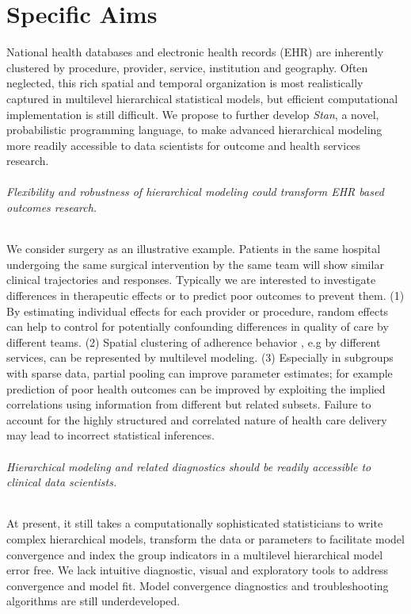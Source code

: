 \documentclass[11pt,notitlepage]{article}
\begin{document}
\part*{Specific Aims}
National health databases and electronic health records (EHR) are inherently clustered by procedure, provider, service, institution and geography. Often neglected, this rich spatial and temporal organization is most realistically captured in multilevel hierarchical statistical models, but efficient computational implementation is still difficult. We propose to further develop \textit{Stan}, a novel, probabilistic programming language, to make advanced hierarchical modeling more readily accessible to data scientists for outcome and health services research. 

\paragraph*{Flexibility and robustness of hierarchical modeling could transform EHR based outcomes research.} We consider surgery as an illustrative example. Patients in the same hospital undergoing the same surgical intervention by the same team will show similar clinical trajectories and responses. Typically we are interested to investigate differences in therapeutic effects or to predict poor outcomes to prevent them. (1) By estimating individual effects for each provider or procedure, random effects can help to control for potentially confounding differences in quality of care by different teams. (2) Spatial clustering of adherence behavior , e.g by different services, can be represented by multilevel modeling. (3) Especially in subgroups with sparse data, partial pooling can improve parameter estimates; for example prediction of poor health outcomes can be improved by exploiting the implied correlations using information from different but related subsets. Failure to account for the highly structured and correlated nature of health care delivery may lead to incorrect statistical inferences.

\paragraph*{Hierarchical modeling and related diagnostics should be readily accessible to clinical data scientists.} At present, it still takes a computationally sophisticated statisticians to write complex hierarchical models, transform the data or parameters to facilitate model convergence and index the group indicators in a multilevel hierarchical model error free. We lack intuitive diagnostic, visual and exploratory tools to address convergence and model fit. Model convergence diagnostics and troubleshooting algorithms are still underdeveloped. 
\end{document}
